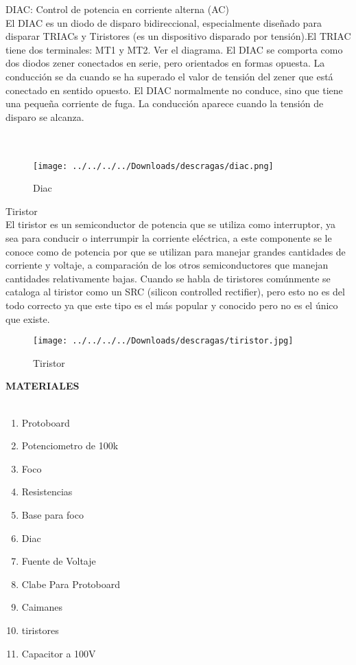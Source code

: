 \documentclass[12pt]{report}
\begin{document}
{\large DIAC: Control de potencia en corriente alterna (AC)\\
El DIAC es un diodo de disparo bidireccional, especialmente diseñado para disparar TRIACs y Tiristores (es un dispositivo disparado por tensión).El TRIAC tiene dos terminales: MT1 y MT2. Ver el diagrama. El DIAC se comporta como dos diodos zener conectados en serie, pero orientados en formas opuesta. La conducción se da cuando se ha superado el valor de tensión del zener que está conectado en sentido opuesto. El DIAC normalmente no conduce, sino que tiene una pequeña corriente de fuga. La conducción aparece cuando la tensión de disparo se alcanza.\\\\ \\
\begin{center}
\begin{figure}[hbtp]
\caption{Diac}
\centering
\texttt{[image: ../../../../Downloads/descragas/diac.png]}
\end{figure}
\end{center}
{\large Tiristor\\El tiristor es un semiconductor de potencia que se utiliza como interruptor, ya sea para conducir o interrumpir la corriente eléctrica, a este componente se le conoce como de potencia por que se utilizan para manejar grandes cantidades de corriente y voltaje, a comparación de los otros semiconductores que manejan cantidades relativamente bajas.
Cuando se habla de tiristores comúnmente se cataloga al tiristor como un SRC (silicon controlled rectifier), pero esto no es del todo correcto ya que este tipo es el más popular y conocido pero no es el único que existe. }}
\begin{center}
\begin{figure}[hbtp]
\centering
\texttt{[image: ../../../../Downloads/descragas/tiristor.jpg]}
\caption{Tiristor }
\end{figure}

\end{center}
\newpage

{\huge \textbf{MATERIALES}\\}\\


\begin{enumerate}
\item Protoboard
\item Potenciometro de 100k
\item Foco
\item Resistencias
\item Base para foco
\item Diac
\item Fuente de Voltaje
\item Clabe Para Protoboard
\item Caimanes
\item tiristores
\item Capacitor a 100V
\end{enumerate}
\end{document}
